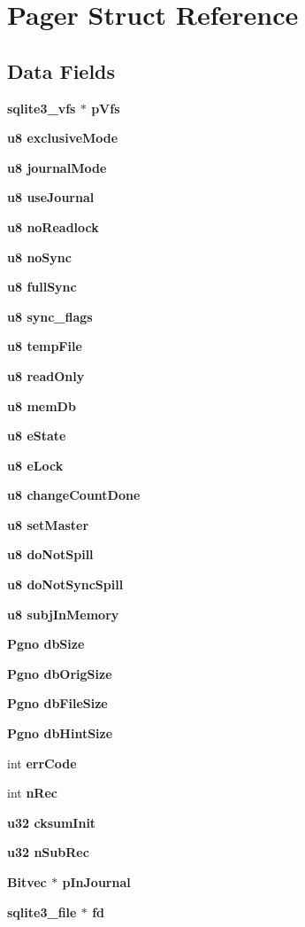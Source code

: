 \section{Pager Struct Reference}
\label{structPager}
\subsection*{Data Fields}
\begin{CompactItemize}
\item 
\bf{sqlite3\_\-vfs} $\ast$ \bf{p\-Vfs}
\item 
\bf{u8} \bf{exclusive\-Mode}
\item 
\bf{u8} \bf{journal\-Mode}
\item 
\bf{u8} \bf{use\-Journal}
\item 
\bf{u8} \bf{no\-Readlock}
\item 
\bf{u8} \bf{no\-Sync}
\item 
\bf{u8} \bf{full\-Sync}
\item 
\bf{u8} \bf{sync\_\-flags}
\item 
\bf{u8} \bf{temp\-File}
\item 
\bf{u8} \bf{read\-Only}
\item 
\bf{u8} \bf{mem\-Db}
\item 
\bf{u8} \bf{e\-State}
\item 
\bf{u8} \bf{e\-Lock}
\item 
\bf{u8} \bf{change\-Count\-Done}
\item 
\bf{u8} \bf{set\-Master}
\item 
\bf{u8} \bf{do\-Not\-Spill}
\item 
\bf{u8} \bf{do\-Not\-Sync\-Spill}
\item 
\bf{u8} \bf{subj\-In\-Memory}
\item 
\bf{Pgno} \bf{db\-Size}
\item 
\bf{Pgno} \bf{db\-Orig\-Size}
\item 
\bf{Pgno} \bf{db\-File\-Size}
\item 
\bf{Pgno} \bf{db\-Hint\-Size}
\item 
int \bf{err\-Code}
\item 
int \bf{n\-Rec}
\item 
\bf{u32} \bf{cksum\-Init}
\item 
\bf{u32} \bf{n\-Sub\-Rec}
\item 
\bf{Bitvec} $\ast$ \bf{p\-In\-Journal}
\item 
\bf{sqlite3\_\-file} $\ast$ \bf{fd}
\item 

\end{CompactItemize}
